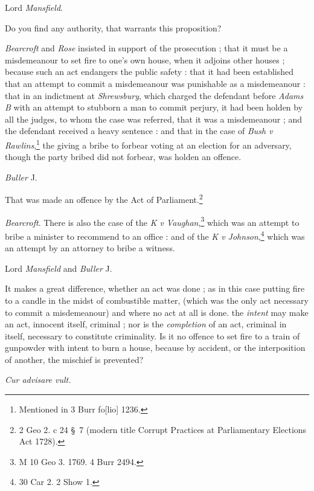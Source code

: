 \documentclass[a4paper]{article}
\begin{document}
\hspace{\parindent} Lord \emph{Mansfield}.

Do you find any authority, that warrants this proposition?

\emph{Bearcroft} and \emph{Rose} insisted in support of the prosecution ; that it must be a misdemeanour to set fire to one's own house, when it adjoins other houses ; because such an act endangers the public safety : that it had been established that an attempt to commit a  misdemeanour was punishable as a misdemeanour : that in an indictment at \emph{Shrewsbury}, which charged the defendant before \emph{Adams B} with an attempt to stubborn a man to commit perjury, it had been holden by all the judges, to whom the case was referred, that it was a misdemeanour ; and the defendant received a heavy sentence : and that in the case of \emph{Bush v Rawlins},\footnote{Mentioned in 3 Burr fo[lio] 1236.} the giving a bribe to forbear voting at an election for an adversary, though the party bribed did not forbear, was holden an offence.

\hspace{\parindent} \emph{Buller} J.

That was made an offence by the Act of Parliament.\footnote{2 Geo 2. c 24 \S\ 7 (modern title Corrupt Practices at Parliamentary Elections Act 1728).}

\emph{Bearcroft}. There is also the case of the \emph{K v Vaughan},\footnote{M 10 Geo 3. 1769. 4 Burr 2494.} which was an attempt to bribe a minister to recommend to an office : and of the \emph{K v Johnson},\footnote{30 Car 2. 2 Show 1.} which was an attempt by an attorney to bribe a witness.

\hspace{\parindent} Lord \emph{Mansfield} and \emph{Buller} J.

It makes a great difference, whether an act was done ; as in this case putting fire to a candle in the midst of combustible matter, (which was the only act necessary to commit a misdemeanour) and where no act at all is done. the \emph{intent} may make an act, innocent itself, criminal ; nor is the \emph{completion} of an act, criminal in itself, necessary to constitute criminality. Is it no offence to set fire to a train of gunpowder with intent to burn a house, because by accident, or the interposition of another, the mischief is prevented?

\hspace{0.7\textwidth} \emph{Cur advisare vult.}
\end{document}
